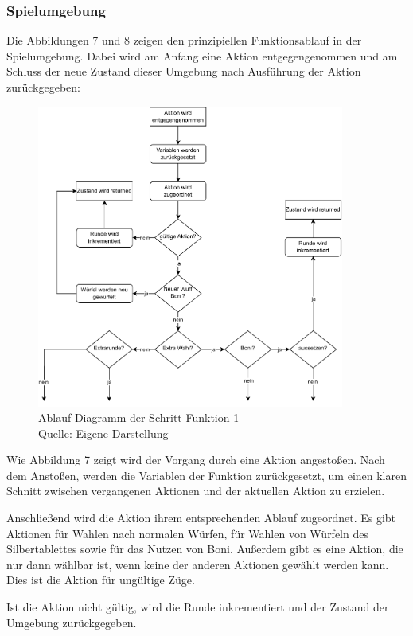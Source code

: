 \subsubsection{Spielumgebung}
Die Abbildungen 7 und 8 zeigen den prinzipiellen Funktionsablauf in der Spielumgebung. Dabei wird am Anfang eine Aktion entgegengenommen und am Schluss der neue Zustand dieser Umgebung nach Ausführung der Aktion zurückgegeben:
\nopagebreak
\begin{figure}[H]
	\centering
	\includegraphics[width=0.9\textwidth]{Bilder/step3.drawio} 
	\caption[Ablauf-Diagramm der Schritt-Funktion 1]{Ablauf-Diagramm der Schritt Funktion 1\\ Quelle: Eigene Darstellung}
\end{figure}	

Wie Abbildung 7 zeigt wird der Vorgang durch eine Aktion angestoßen. Nach dem Anstoßen, werden die Variablen der Funktion zurückgesetzt, um einen klaren Schnitt zwischen vergangenen Aktionen und der aktuellen Aktion zu erzielen.

Anschließend wird die Aktion ihrem entsprechenden Ablauf zugeordnet. Es gibt Aktionen für Wahlen nach normalen Würfen, für Wahlen von Würfeln des Silbertablettes sowie für das Nutzen von Boni. Außerdem gibt es eine Aktion, die nur dann wählbar ist, wenn keine der anderen Aktionen gewählt werden kann. Dies ist die Aktion für ungültige Züge.

Ist die Aktion nicht gültig, wird die Runde inkrementiert und der Zustand der Umgebung zurückgegeben.


